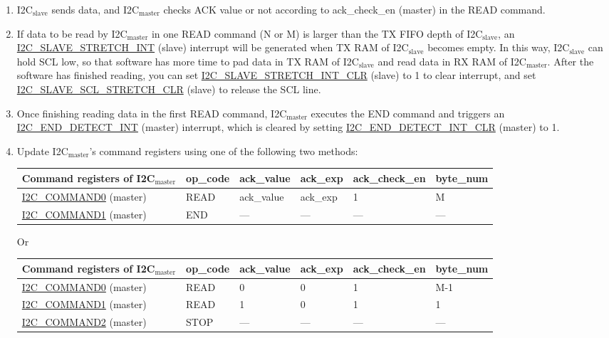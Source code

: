 \documentclass[main\_\_EN.tex]{subfiles}
\begin{document}
\begin{enumerate}
\item I2C$_\text{slave}$ sends data, and I2C$_\text{master}$ checks ACK value or not according to ack\_check\_en (master) in the READ command.
\item If data to be read by I2C$_\text{master}$ in one READ command (N or M) is larger than the TX FIFO depth of I2C$_\text{slave}$, an \hyperref[int:i2c-slave-stretch]{I2C\_SLAVE\_STRETCH\_INT} (slave) interrupt will be generated when TX RAM of I2C$_\text{slave}$ becomes empty. In this way, I2C$_\text{slave}$ can hold SCL low, so that software has more time to pad data in TX RAM of I2C$_\text{slave}$ and read data in RX RAM of I2C$_\text{master}$. After the software has finished reading, you can set \hyperref[fielddesc:I2CSLAVESTRETCHINTCLR]{I2C\_SLAVE\_STRETCH\_INT\_CLR} (slave) to 1 to clear interrupt, and set \hyperref[fielddesc:I2CSLAVESCLSTRETCHCLR]{I2C\_SLAVE\_SCL\_STRETCH\_CLR} (slave) to release the SCL line.
\item Once finishing reading data in the first READ command, I2C$_\text{master}$ executes the END command and triggers an \hyperref[int:i2c-end]{I2C\_END\_DETECT\_INT} (master) interrupt, which is cleared by setting \hyperref[fielddesc:I2CENDDETECTINTCLR]{I2C\_END\_DETECT\_INT\_CLR} (master) to 1.
\item Update I2C$_\text{master}$'s command registers using one of the following two methods:
\begin{longtable}{ | p{5cm} | p{1.5cm} | p{1.5cm} | p{1.5cm} |p{2.5cm} | p{1.5cm}|}
\hline\rowcolor{lightgray}
Command registers of I2C$_\text{master}$& op\_code & ack\_value&ack\_exp&ack\_check\_en&byte\_num  \\ \hline
\hyperref[fielddesc:I2CCOMMAND0]{I2C\_COMMAND0} (master)& READ& ack\_value&ack\_exp&1&M  \\ \hline
\hyperref[fielddesc:I2CCOMMAND1]{I2C\_COMMAND1} (master)& END& ---&---&---&---  \\ \hline
\end{longtable} 

Or

\begin{longtable}{ | p{5cm} | p{1.5cm} | p{1.5cm} | p{1.5cm} |p{2.5cm} | p{1.5cm}|}
\hline\rowcolor{lightgray}
Command registers of I2C$_\text{master}$& op\_code & ack\_value&ack\_exp&ack\_check\_en&byte\_num  \\ \hline
\hyperref[fielddesc:I2CCOMMAND0]{I2C\_COMMAND0} (master)& READ& 0&0&1&M-1  \\ \hline
\hyperref[fielddesc:I2CCOMMAND1]{I2C\_COMMAND1} (master)& READ& 1&0&1&1  \\ \hline
\hyperref[fielddesc:I2CCOMMAND2]{I2C\_COMMAND2} (master)& STOP& ---&---&---&---  \\ \hline
\end{longtable} 





\end{enumerate}
\end{document}
